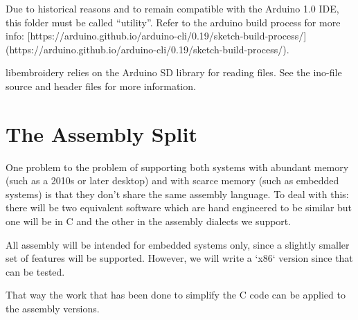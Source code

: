 Due to historical reasons and to remain compatible with the Arduino 1.0
IDE, this folder must be called ``utility''. Refer to the arduino build
process for more info:
[https://arduino.github.io/arduino-cli/0.19/sketch-build-process/](https://arduino.github.io/arduino-cli/0.19/sketch-build-process/).

libembroidery relies on the Arduino SD library for reading files. See
the ino-file source and header files for more information.

\section{The Assembly Split}

One problem to the problem of supporting both systems with abundant memory
(such as a 2010s or later desktop) and with scarce memory (such as embedded
systems) is that they don't share the same assembly language. To deal with
this: there will be two equivalent software which are hand engineered to be
similar but one will be in C and the other in the assembly dialects we support.

All assembly will be intended for embedded systems only, since a slightly
smaller set of features will be supported. However, we will write a
`x86` version since that can be tested.

That way the work that has been done to simplify the C code can be applied to
the assembly versions.
